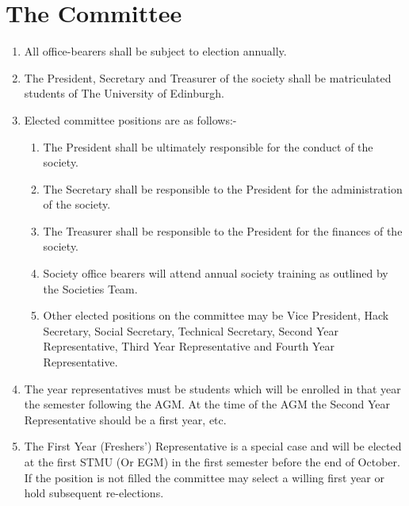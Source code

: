\documentclass{article}
\begin{document}
\newpage{}
\section{The Committee}

\begin {enumerate}
  
  \item All office-bearers shall be subject to election annually.

  \item The President, Secretary and Treasurer of the society shall be matriculated students of The University of Edinburgh.

  \item Elected committee positions are as follows:-
    \begin{enumerate}
      \item The President shall be ultimately responsible for the conduct of the society.
      \item The Secretary shall be responsible to the President for the administration of the society.
      \item The Treasurer shall be responsible to the President for the finances of the society.
      \item Society office bearers will attend annual society training as outlined by the Societies Team.
      \item Other elected positions on the committee may be Vice President, Hack Secretary, Social
        Secretary, Technical Secretary, Second Year Representative, 
        Third Year Representative and Fourth Year Representative.
    \end{enumerate}

  \item The year representatives must be students which will be enrolled in that year the semester 
    following the AGM. At the time of the AGM the Second Year Representative should be a first year, etc.
  
  \item The First Year (Freshers') Representative is a special case and will be elected at the first STMU (Or EGM)
    in the first semester before the end of October. If the position is not filled the committee may select a
    willing first year or hold subsequent re-elections.


\end{enumerate}
\end{document}
